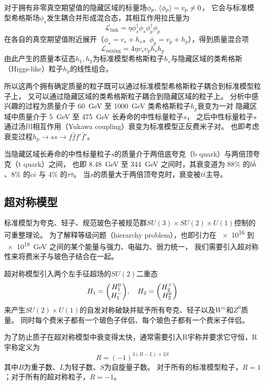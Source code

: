 对于拥有非零真空期望值的隐藏区域的标量场$\phi_p, \,\expval{\phi_p}=v_p \neq 0$，
它会与标准模型希格斯场$\phi_s$发生耦合并形成混合态，其相互作用拉氏量为
\begin{equation}
    \mathcal{L}_\text{link} = \eta \phi^\dagger_s \phi_s \phi^\dagger_p \phi_p
\end{equation}
在各自的真空期望值附近展开（$\phi_s = v_s + h_s$，$\phi_p = v_p + h_p$），得到质量混合项
\begin{equation}
    \mathcal{L}_\text{mixing} = 4 \eta v_s v_p h_s h_p
\end{equation}
由此产生的质量本征态$h_1, h_2$为标准模型希格斯粒子$h_s$与隐藏区域的类希格斯（Higgs-like）粒子$h_p$的线性组合。

所以这两个拥有确定质量的粒子既可以通过标准模型希格斯粒子耦合到标准模型粒子上，
又可以通过隐藏区域的类希格斯粒子耦合到隐藏区域的粒子上。
分析中感兴趣的过程为质量介于 \SI{60}{GeV} 至 \SI{1000}{GeV} 类希格斯粒子$h_p$衰变为一对
隐藏区域中质量介于 \SI{5}{GeV} 至 \SI{475}{GeV} 长寿命的中性标量粒子$s$，
之后中性标量粒子$s$通过汤川相互作用（Yukawa coupling）衰变为标准模型正反费米子对。
也即考虑衰变过程$h_p \rightarrow ss \rightarrow f \bar{f} f' \bar{f}'$。

当隐藏区域长寿命的中性标量粒子$s$的质量介于两倍底夸克（b quark）与两倍顶夸克（t quark）之间，
也即 \SI{8.48}{GeV} 至 \SI{344}{GeV} 之间时，其衰变道为 88\% 的$b \bar{b}$、8\% 的$c \bar{c}$ 与 4\% 的$\tau \bar{\tau}$。
当$s$的质量大于两倍顶夸克时，衰变被$t \bar{t}$主导。


\subsection{超对称模型}
标准模型为夸克、轻子、规范玻色子被规范群$SU(3)\times SU(2) \times U(1)$控制的可重整理论。
为了解释等级问题（hierarchy problem），也即引力在 \num{e16} 到 \SI{e18}{GeV} 之间的某个能量与强力、电磁力、弱力统一，
我们需要引入超对称性来将费米子与玻色子结合在一起。

超对称模型引入两个左手征超场的$SU(2)$二重态
$$H_1 = \mqty(H_1^0 \\ H_1^-) \qc H_2 = \mqty(H_2^+ \\ H_2^0) $$
来产生$SU(2) \times U(1)$的自发对称破缺并赋予所有夸克、轻子以及$W^\pm$和$Z^0$质量。
同时每个费米子都有一个玻色子伴侣、每个玻色子都有一个费米子伴侣。
\cite{QFT_Weinberg}

为了防止质子在超对称模型中衰变得太快，通常需要引入R宇称并要求它守恒，R宇称定义为
\begin{equation}
    R = (-1)^{3(B-L)+2S}
\end{equation}
其中$B$为重子数、$L$为轻子数、$S$为自旋量子数。
对于所有的标准模型粒子，$R=1$；对于所有的超对称粒子，$R=-1$。
\cite{SUSY_ATLAS}

